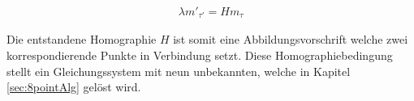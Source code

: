 \begin{gather}
	\lambda m'_{\tau'} = H m_\tau\label{eq:H}
\end{gather} 


Die entstandene Homographie $H$ ist somit eine Abbildungsvorschrift welche zwei korrespondierende Punkte in Verbindung setzt. %
Diese Homographiebedingung stellt ein Gleichungssystem mit neun unbekannten, welche in Kapitel \ref{sec:8pointAlg} gelöst wird\cite{HZ}.



% 
% 
% 
% 
% 
% 
% 
% 
% 
